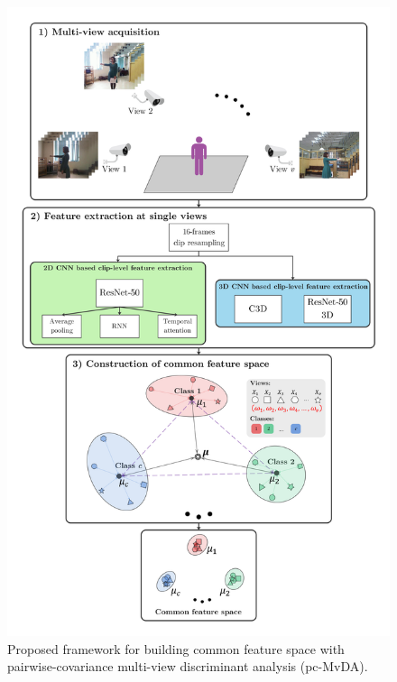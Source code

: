     \begin{figure}[htbp]
        \centering
        \includegraphics[width=0.85\linewidth]{figs/Framework.png}
        \caption{Proposed framework for building common feature space with pairwise-covariance multi-view discriminant analysis (pc-MvDA).}
        \label{fig:frw}
    \end{figure}
